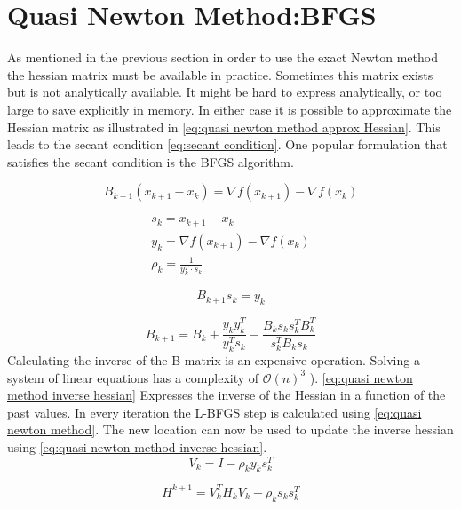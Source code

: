 	\section{Quasi Newton Method:BFGS}
	As mentioned in the previous section in order to use the exact Newton method the hessian matrix must be available in practice. Sometimes this matrix exists but is not analytically available. It might be hard to express analytically, or too large to save explicitly in memory. In either case it is possible to approximate the Hessian matrix as illustrated in \eqref{eq:quasi newton method approx Hessian}.  This leads to the secant condition \eqref{eq:secant condition}. One popular formulation that satisfies the secant condition is the BFGS algorithm.
		
		\begin{equation}
			B_{k+1}(x_{k+1}-x_k) = \nabla f(x_{k+1}) - \nabla f(x_k)
			\label{eq:quasi newton method approx Hessian}	
		\end{equation}
		
		\begin{eqnarray}
			s_k = x_{k+1} - x_{k} \\
			y_k = \nabla f(x_{k+1}) - \nabla f(x_{k}) \\
			\rho_k = \frac{1}{y_k^T \cdot s_k}
		\end{eqnarray}
	
		
		\begin{equation}
			B_{k+1} s_{k} = y_{k}
			\label{eq:secant condition}
		\end{equation}
		
		\begin{equation}
			B_{k+1} = B_{k} + \frac{y_k y_k^T}{ y_k^T s_k} - \frac{B_k s_k s_k^T B_k^T}{s_k^TB_ks_k}
			\label{eq:quasi newton method approx Hessian with past values}
		\end{equation}
	Calculating the inverse of the B matrix is an expensive operation. Solving a system of linear equations has a complexity of $\mathcal{O}(n)^3$ ). \eqref{eq:quasi newton method inverse hessian} Expresses the inverse of the Hessian in a function of the past values. In every iteration the L-BFGS step is calculated using \eqref{eq:quasi newton method}. The new location can now be used to update the inverse hessian using \eqref{eq:quasi newton method inverse hessian}.
		\begin{equation}
			V_k = I - \rho_ky_ks_k^T
		\end{equation}
	
		\begin{equation}
			H^{k+1} = V_k^TH_kV_k + \rho_ks_ks_k^T
			\label{eq:quasi newton method inverse hessian}	
		\end{equation}
		
